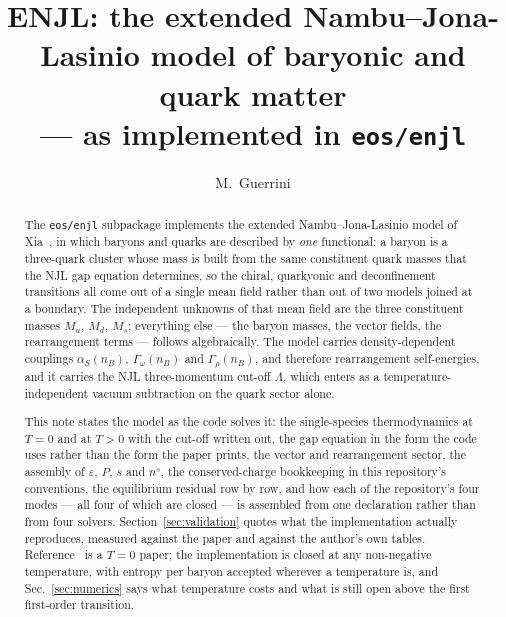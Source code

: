 \documentclass[aps,prc,onecolumn,superscriptaddress,nofootinbib,10pt]{revtex4-2}
\newcommand{\nB}{n_B}
\begin{document}
\title{ENJL: the extended Nambu--Jona-Lasinio model of baryonic and quark
       matter \\
       --- as implemented in \texttt{eos/enjl}}

\author{M.~Guerrini}

\begin{abstract}
The \texttt{eos/enjl} subpackage implements the extended Nambu--Jona-Lasinio
model of Xia~\cite{Xia2024}, in which baryons and quarks are described by
\emph{one} functional: a baryon is a three-quark cluster whose mass is built
from the same constituent quark masses that the NJL gap equation
determines, so the chiral, quarkyonic and deconfinement transitions all come
out of a single mean field rather than out of two models joined at a
boundary. The independent unknowns of that mean field are the three
constituent masses $M_u$, $M_d$, $M_s$; everything else --- the baryon masses,
the vector fields, the rearrangement terms --- follows algebraically. The
model carries density-dependent couplings $\alpha_S(\nB)$, $\Gamma_\omega(\nB)$
and $\Gamma_\rho(\nB)$, and therefore rearrangement self-energies, and it
carries the NJL three-momentum cut-off $\Lambda$, which enters as a
temperature-independent vacuum subtraction on the quark sector alone.

This note states the model as the code solves it: the single-species
thermodynamics at $T = 0$ and at $T > 0$ with the cut-off written out, the
gap equation in
the form the code uses rather than the form the paper prints, the vector and
rearrangement sector, the assembly of $\varepsilon$, $P$, $s$ and $n^s$, the
conserved-charge bookkeeping in this repository's conventions, the
equilibrium residual row by row, and how each of the repository's four modes
--- all four of which are closed --- is assembled from one declaration rather
than from four solvers. Section~\ref{sec:validation}
quotes what the implementation actually reproduces, measured against the
paper and against the author's own tables. Reference~\cite{Xia2024} is a
$T = 0$ paper; the implementation is closed at any non-negative temperature,
with entropy per baryon accepted wherever a temperature is, and
Sec.~\ref{sec:numerics} says what temperature costs and what is still open
above the first first-order transition.
\end{abstract}

\maketitle
\end{document}
